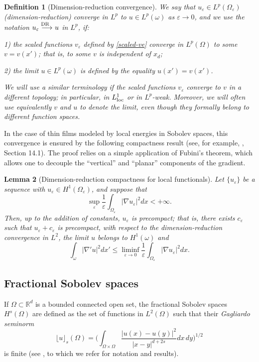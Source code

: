 \documentclass[11pt]{article}
\newtheorem{definition}{Definition}[section]
\newtheorem{lemma}[definition]{Lemma}
\def\e{\varepsilon}
\begin{document}
\begin{definition}[Dimension-reduction convergence]\label{drco}
We say that $u_\e\in L^p(\Omega_\e)$ {\em (di\-men\-sion-reduction) converge in $L^p$} to $u\in L^p(\omega)$ as $\e\to0$, and we use the notation $u_\e\buildrel{\hbox {\rm\scriptsize DR }\, \, }\over{\longrightarrow} u$ in $L^p$, if:  

{\rm1)} the scaled functions $v_\e$ defined by \eqref{scaled-ve} converge in $L^p(\Omega)$ to some $v=v(x')$; that is, to some $v$  is independent of $x_d$; 

{\rm2)} the limit $u\in L^p(\omega)$ is defined by the equality $u(x')=v(x')$. 

\smallskip 
\noindent We will use a similar terminology if the scaled functions $v_\e$ converge to $v$ in a different topology; in particular, in $L^1_{\rm loc}$ or in $L^p$-weak. Moreover, we will often use equivalently $v$ and $u$ to denote the limit, even though they formally belong to different function spaces.
\end{definition}


In the case of thin films modeled by local energies in Sobolev spaces, this convergence is ensured by the following compactness result (see, for example, \cite{GCB}, Section 14.1). The proof relies on a simple application of Fubini’s theorem, which allows one to decouple the “vertical” and “planar” components of the gradient. 

\begin{lemma}[Dimension-reduction compactness for local functionals]\label{local-lemma}
Let $\{u_\e\}$ be a sequence with $u_\e\in H^1(\Omega_\e)$, and suppose that 
$$
\sup_\e\frac1\e\int_{\Omega_\e} |\nabla u_\e|^2dx<+\infty.
$$
Then, up to the addition of constants, $u_\e$ is precompact; that is, there exists $c_\e$ such that $u_\e+c_\e$ is precompact, with respect to the di\-men\-sion-reduction convergence in $L^2$, the limit  $u$ belongs to $H^1(\omega)$ and
$$
\int_\omega |\nabla'u|^2dx'\le \liminf_{\e\to 0}\frac1\e\int_{\Omega_\e} |\nabla u_\e|^2dx.
$$ 
\end{lemma}


\subsection{Fractional Sobolev spaces}
If $\Omega\subset \mathbb R^d$ is a bounded connected open set, the fractional Sobolev spaces $H^s(\Omega)$ are defined as the set of functions in $L^2(\Omega)$ such that their {\em Gagliardo seminorm}
$$
\lfloor u
\rfloor_s(\Omega)=\bigg(\int_{\Omega\times \Omega} \frac{|u(x)-u(y)|^2}{|x-y|^{d+2s}} dx\,dy\bigg)^{1/2}
$$
is finite (see \cite{leofrac,DPV}, to which we refer for notation and results). 
\end{document}
